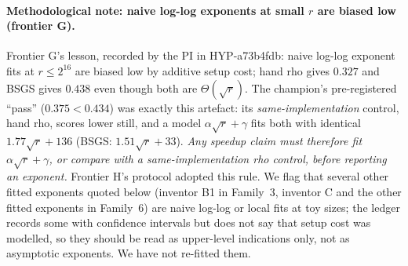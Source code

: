 \documentclass[11pt,a4paper]{article}
\theoremstyle{remark}
\begin{document}
\paragraph{Methodological note: naive log-log exponents at small $r$ are biased low (frontier G).} Frontier G's lesson, recorded by the PI in \mbox{HYP-a73b4fdb}: naive log-log exponent fits at $r\le2^{16}$ are biased low by additive setup cost; hand rho gives $0.327$ and BSGS gives $0.438$ even though both are $\Theta(\sqrt r)$. The champion's pre-registered ``pass'' ($0.375<0.434$) was exactly this artefact: its \emph{same-implementation} control, hand rho, scores lower still, and a model $\alpha\sqrt r+\gamma$ fits both with identical $1.77\sqrt r+136$ (BSGS: $1.51\sqrt r+33$). \emph{Any speedup claim must therefore fit $\alpha\sqrt r+\gamma$, or compare with a same-implementation rho control, before reporting an exponent.} Frontier H's protocol adopted this rule. We flag that several other fitted exponents quoted below (inventor B1 in Family~3, inventor C and the other fitted exponents in Family~6) are naive log-log or local fits at toy sizes; the ledger records some with confidence intervals but does not say that setup cost was modelled, so they should be read as upper-level indications only, not as asymptotic exponents. We have not re-fitted them.
\end{document}
